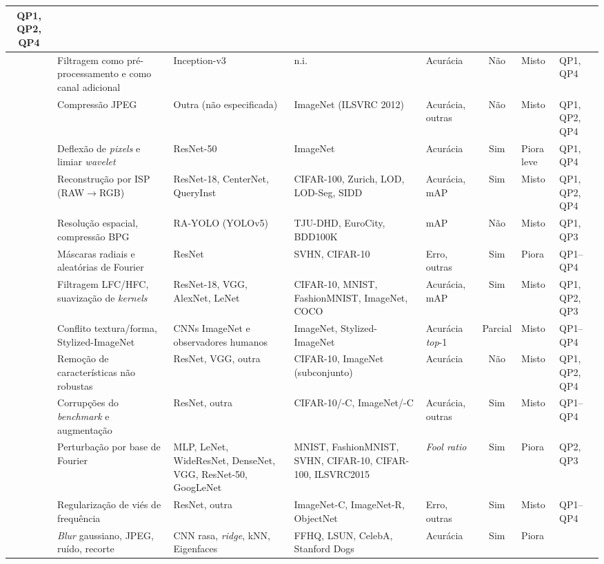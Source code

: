 \documentclass[conference]{IEEEtran}
\begin{document}
\begin{table}[htbp]
\begin{center}
\begin{tabular}{|c|p{3.1cm}|p{2.7cm}|p{3.1cm}|p{1.7cm}|c|p{1.4cm}|p{1.3cm}|}
QP1, QP2, QP4 \\
\hline
\cite{b9} & Filtragem como pré-processamento e como canal adicional &
Inception-v3 & n.i. & Acurácia & Não & Misto & QP1, QP4 \\
\hline
\cite{b10} & Compressão JPEG & Outra (não especificada) & ImageNet
(ILSVRC 2012) & Acurácia, outras & Não & Misto & QP1, QP2, QP4 \\
\hline
\cite{b11} & Deflexão de \textit{pixels} e limiar \textit{wavelet} &
ResNet-50 & ImageNet & Acurácia & Sim & Piora leve & QP1, QP4 \\
\hline
\cite{b12} & Reconstrução por ISP (RAW$\rightarrow$RGB) & ResNet-18,
CenterNet, QueryInst & CIFAR-100, Zurich, LOD, LOD-Seg, SIDD & Acurácia, mAP & Sim &
Misto & QP1, QP2, QP4 \\
\hline
\cite{b13} & Resolução espacial, compressão BPG & RA-YOLO (YOLOv5) & TJU-DHD,
EuroCity, BDD100K & mAP & Não & Misto & QP1, QP3 \\
\hline
\cite{b14} & Máscaras radiais e aleatórias de Fourier &
ResNet & SVHN, CIFAR-10 & Erro, outras & Sim & Piora & QP1--QP4 \\
\hline
\cite{b15} & Filtragem LFC/HFC, suavização de \textit{kernels} & ResNet-18,
VGG, AlexNet, LeNet & CIFAR-10, MNIST, FashionMNIST, ImageNet, COCO & Acurácia, mAP
& Sim & Misto & QP1, QP2, QP3 \\
\hline
\cite{b16} & Conflito textura/forma, Stylized-ImageNet & CNNs ImageNet e
observadores humanos & ImageNet, Stylized-ImageNet & Acurácia \textit{top}-1 &
Parcial & Misto & QP1--QP4 \\
\hline
\cite{b17} & Remoção de características não robustas & ResNet, VGG, outra &
CIFAR-10, ImageNet (subconjunto) & Acurácia & Não & Misto & QP1, QP2, QP4 \\
\hline
\cite{b18} & Corrupções do \textit{benchmark} e augmentação & ResNet, outra &
CIFAR-10/-C, ImageNet/-C & Acurácia, outras & Sim & Misto & QP1--QP4 \\
\hline
\cite{b19} & Perturbação por base de Fourier & MLP, LeNet, WideResNet,
DenseNet, VGG, ResNet-50, GoogLeNet & MNIST, FashionMNIST, SVHN, CIFAR-10,
CIFAR-100, ILSVRC2015 & \textit{Fool ratio} & Sim & Piora & QP2, QP3 \\
\hline
\cite{b20} & Regularização de viés de frequência & ResNet, outra & ImageNet-C,
ImageNet-R, ObjectNet & Erro, outras & Sim & Misto & QP1--QP4 \\
\hline
\cite{b21} & \textit{Blur} gaussiano, JPEG, ruído, recorte & CNN rasa, \textit{ridge},
kNN, Eigenfaces & FFHQ, LSUN, CelebA, Stanford Dogs & Acurácia & Sim & Piora &

\end{tabular}
\end{center}
\end{table}
\end{document}
